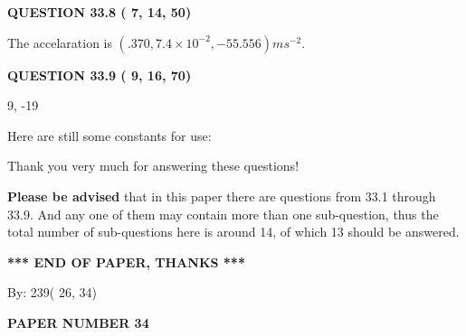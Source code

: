 \documentclass[12pt]{article}
\begin{document}
 
 
  
\vspace{0.2in}
  
{\textbf{\Large{QUESTION
33.8 
 (          7,         14,         50)
}}}
  
  
 
 
\noindent{}
 
 
  The accelaration is $  %
(
.370,
7.4 \times 10^{-2},
-55.556)
ms^{-2} $.
 
 
 
 
  
\vspace{0.2in}
  
{\textbf{\Large{QUESTION
33.9 
 (          9,         16,         70)
}}}
  
  


 
 
\noindent{}

9,  %
-19
 
 
 
   
   
 \vspace{0.2in}
Here are still some constants for use:
 
 
 
 
Thank you very much for answering these questions!
 
{\textbf{\large{Please be advised}}} that in this paper there are questions from
33.1 through
33.9.
And any one of them may contain more than one sub-question, thus the total number
of sub-questions here is around 14, of which
13 should be answered.
 
   
   
   
   
\vspace{1.0in} 
{\textbf{\large{ *** END OF PAPER, THANKS *** }}} 
   
   
\hspace{1.0in} By: 
         239(         26,          34)
   
   
   
   
\newpage 
\setcounter{page}{ 
    34001 } 
   
   
   
   
 {\textbf{ \Large{ PAPER NUMBER          34 }}}
   
   
\vspace{0.2in}
   
\end{document}

